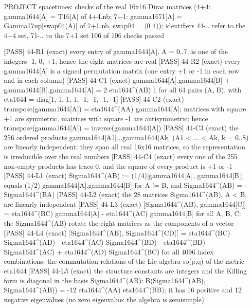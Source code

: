 \documentclass[
  10pt,
]{article}
\newenvironment{Shaded}{}{}
\newcommand{\NormalTok}[1]{#1}
\begin{document}
\begin{Shaded}
\begin{Highlighting}[]
\NormalTok{PROJECT spacetimes: checks of the real 16x16 Dirac matrices (4+4: gamma1644[A] = T16[A] of 4+4.nb; 7+1: gamma1671[A] = Gamma17up[swap04(A)] of 7+1.nb, swap04 = (0 4)); identifiers 44{-}.. refer to the 4+4 set, 71{-}.. to the 7+1 set}
\NormalTok{106 of 106 checks passed}

\NormalTok{[PASS] 44{-}R1  (exact) every entry of gamma1644[A], A = 0..7, is one of the integers {-}1, 0, +1; hence the eight matrices are real}
\NormalTok{[PASS] 44{-}R2  (exact) every gamma1644[A] is a signed permutation matrix (one entry +1 or {-}1 in each row and in each column)}
\NormalTok{[PASS] 44{-}C1  (exact) gamma1644[A].gamma1644[B] + gamma1644[B].gamma1644[A] = 2 eta1644\^{}(AB) 1 for all 64 pairs (A, B), with eta1644 = diag[1, 1, 1, 1, {-}1, {-}1, {-}1, {-}1]}
\NormalTok{[PASS] 44{-}C2  (exact) transpose(gamma1644[A]) = eta1644\^{}(AA) gamma1644[A]: matrices with square +1 are symmetric, matrices with square {-}1 are antisymmetric; hence transpose(gamma1644[A]) = inverse(gamma1644[A])}
\NormalTok{[PASS] 44{-}C3  (exact) the 256 ordered products gamma1644[A1]...gamma1644[Ak] (A1 \textless{} ... \textless{} Ak, k = 0..8) are linearly independent: they span all real 16x16 matrices, so the representation is irreducible over the real numbers}
\NormalTok{[PASS] 44{-}C4  (exact) every one of the 255 non{-}empty products has trace 0, and the square of every product is +1 or {-}1}
\NormalTok{[PASS] 44{-}L1  (exact) Sigma1644\^{}(AB) := (1/4)[gamma1644[A], gamma1644[B]] equals (1/2) gamma1644[A].gamma1644[B] for A != B, and Sigma1644\^{}(AB) = {-}Sigma1644\^{}(BA)}
\NormalTok{[PASS] 44{-}L2  (exact) the 28 matrices Sigma1644\^{}(AB), A \textless{} B, are linearly independent}
\NormalTok{[PASS] 44{-}L3  (exact) [Sigma1644\^{}(AB), gamma1644[C]] = eta1644\^{}(BC) gamma1644[A] {-} eta1644\^{}(AC) gamma1644[B] for all A, B, C: the Sigma1644\^{}(AB) rotate the eight matrices as the components of a vector}
\NormalTok{[PASS] 44{-}L4  (exact) [Sigma1644\^{}(AB), Sigma1644\^{}(CD)] = eta1644\^{}(BC) Sigma1644\^{}(AD) {-} eta1644\^{}(AC) Sigma1644\^{}(BD) {-} eta1644\^{}(BD) Sigma1644\^{}(AC) + eta1644\^{}(AD) Sigma1644\^{}(BC) for all 4096 index combinations: the commutation relations of the Lie algebra so(p,q) of the metric eta1644}
\NormalTok{[PASS] 44{-}L5  (exact) the structure constants are integers and the Killing form is diagonal in the basis Sigma1644\^{}(AB): B(Sigma1644\^{}(AB), Sigma1644\^{}(AB)) = {-}12 eta1644\^{}(AA) eta1644\^{}(BB); it has 16 positive and 12 negative eigenvalues (no zero eigenvalue: the algebra is semisimple)}

\end{Highlighting}
\end{Shaded}
\end{document}
